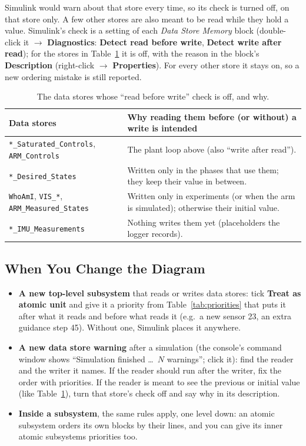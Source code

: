 \documentclass[11pt,a4paper]{article}
\newcommand{\ui}[1]{\textsf{\textbf{#1}}}
\newcommand{\fn}[1]{\texttt{#1}}
\begin{document}
Simulink would warn about that store every time, so its check is turned off, on that store only. A few other
stores are also meant to be read while they hold a value. Simulink's check is a setting of each \emph{Data Store
Memory} block (double-click it $\rightarrow$ \ui{Diagnostics}: \ui{Detect read before write}, \ui{Detect write
after read}); for the stores in Table~\ref{tab:stores} it is off, with the reason in the block's
\ui{Description} (right-click $\rightarrow$ \ui{Properties}). For every other store it stays on, so a new
ordering mistake is still reported.

\begin{table}[h]
\centering\small
\caption{The data stores whose ``read before write'' check is off, and why.}
\label{tab:stores}
\begin{tabular}{@{}>{\raggedright\arraybackslash}p{5.3cm} >{\raggedright\arraybackslash}p{9.6cm}@{}}
\toprule
Data stores & Why reading them before (or without) a write is intended \\
\midrule
\fn{*\_Saturated\_Controls}, \fn{ARM\_Controls} & The plant loop above (also ``write after read''). \\
\fn{*\_Desired\_States} & Written only in the phases that use them; they keep their value in between. \\
\fn{WhoAmI}, \fn{VIS\_*}, \fn{ARM\_Measured\_States} & Written only in experiments (or when the arm is simulated); otherwise their initial value. \\
\fn{*\_IMU\_Measurements} & Nothing writes them yet (placeholders the logger records). \\
\bottomrule
\end{tabular}
\end{table}

\subsection{When You Change the Diagram}
\begin{itemize}
  \item \textbf{A new top-level subsystem} that reads or writes data stores: tick \ui{Treat as atomic unit}
        and give it a priority from Table~\ref{tab:priorities} that puts it after what it reads and before what
        reads it (e.g.\ a new sensor 23, an extra guidance step 45). Without one, Simulink places it anywhere.
  \item \textbf{A new data store warning} after a simulation (the console's command window shows ``Simulation
        finished \ldots\ $N$ warnings''; click it): find the reader and the writer it names. If the reader should
        run after the writer, fix the order with priorities. If the reader is meant to see the previous or
        initial value (like Table~\ref{tab:stores}), turn that store's check off and say why in its description.
  \item \textbf{Inside a subsystem}, the same rules apply, one level down: an atomic subsystem orders its own
        blocks by their lines, and you can give its inner atomic subsystems priorities too.
\end{itemize}
\end{document}
